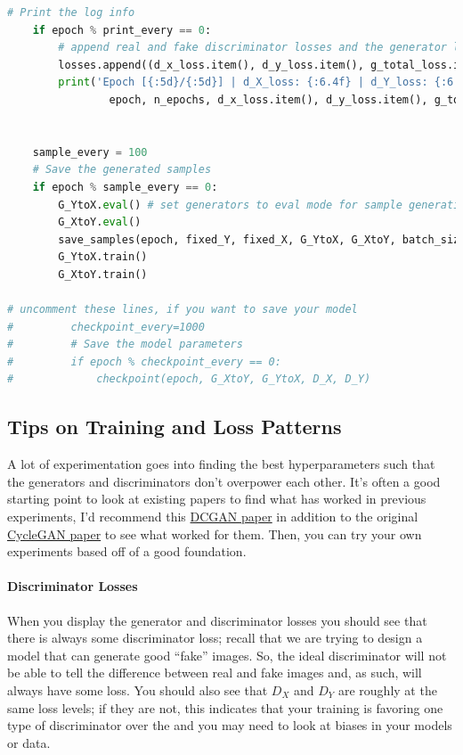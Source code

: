 \begin{lstlisting}[language=Python]
    # Print the log info
    if epoch % print_every == 0:
        # append real and fake discriminator losses and the generator loss
        losses.append((d_x_loss.item(), d_y_loss.item(), g_total_loss.item()))
        print('Epoch [{:5d}/{:5d}] | d_X_loss: {:6.4f} | d_Y_loss: {:6.4f} | g_total_loss: {:6.4f}'.format(
                epoch, n_epochs, d_x_loss.item(), d_y_loss.item(), g_total_loss.item()))


    sample_every = 100
    # Save the generated samples
    if epoch % sample_every == 0:
        G_YtoX.eval() # set generators to eval mode for sample generation
        G_XtoY.eval()
        save_samples(epoch, fixed_Y, fixed_X, G_YtoX, G_XtoY, batch_size=16)
        G_YtoX.train()
        G_XtoY.train()

# uncomment these lines, if you want to save your model
#         checkpoint_every=1000
#         # Save the model parameters
#         if epoch % checkpoint_every == 0:
#             checkpoint(epoch, G_XtoY, G_YtoX, D_X, D_Y)

\end{lstlisting}

\subsection{Tips on Training and Loss
Patterns}

A lot of experimentation goes into finding the best hyperparameters such
that the generators and discriminators don't overpower each other. It's
often a good starting point to look at existing papers to find what has
worked in previous experiments, I'd recommend this
\href{https://arxiv.org/pdf/1511.06434.pdf}{DCGAN paper} in addition to
the original \href{https://arxiv.org/pdf/1703.10593.pdf}{CycleGAN paper}
to see what worked for them. Then, you can try your own experiments
based off of a good foundation.

\paragraph{Discriminator Losses}

When you display the generator and discriminator losses you should see
that there is always some discriminator loss; recall that we are trying
to design a model that can generate good ``fake'' images. So, the ideal
discriminator will not be able to tell the difference between real and
fake images and, as such, will always have some loss. You should also
see that \(D_X\) and \(D_Y\) are roughly at the same loss levels; if
they are not, this indicates that your training is favoring one type of
discriminator over the and you may need to look at biases in your models
or data.

